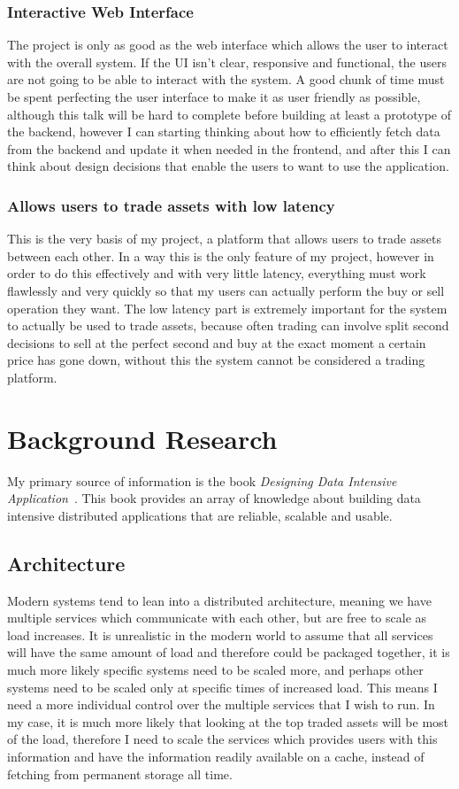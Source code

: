\documentclass[titlepage]{article}
\begin{document}
\subsubsection{Interactive Web Interface}
The project is only as good as the web interface which allows the user to interact with the overall system. If the UI isn't clear, responsive and functional, the users are not going to be able to interact with the system. A good chunk of time must be spent perfecting the user interface to make it as user friendly as possible, although this talk will be hard to complete before building at least a prototype of the backend, however I can starting thinking about how to efficiently fetch data from the backend and update it when needed in the frontend, and after this I can think about design decisions that enable the users to want to use the application.

\subsubsection{Allows users to trade assets with low latency}
This is the very basis of my project, a platform that allows users to trade assets between each other. In a way this is the only feature of my project, however in order to do this effectively and with very little latency, everything must work flawlessly and very quickly so that my users can actually perform the buy or sell operation they want. The low latency part is extremely important for the system to actually be used to trade assets, because often trading can involve split second decisions to sell at the perfect second and buy at the exact moment a certain price has gone down, without this the system cannot be considered a trading platform.

\section{Background Research}
My primary source of information is the book \textit{Designing Data Intensive Application}~\cite{kleppmann_2021}. This book provides an array of knowledge about building data intensive distributed applications that are reliable, scalable and usable.

\subsection{Architecture}
Modern systems tend to lean into a distributed architecture, meaning we have multiple services which communicate with each other, but are free to scale as load increases. It is unrealistic in the modern world to assume that all services will have the same amount of load and therefore could be packaged together, it is much more likely specific systems need to be scaled more, and perhaps other systems need to be scaled only at specific times of increased load. This means I need a more individual control over the multiple services that I wish to run. In my case, it is much more likely that looking at the top traded assets will be most of the load, therefore I need to scale the services which provides users with this information and have the information readily available on a cache, instead of fetching from permanent storage all time. 
\end{document}
